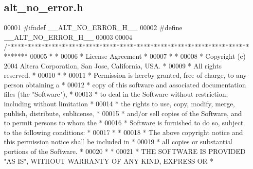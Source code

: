 \subsection{alt\+\_\+no\+\_\+error.\+h}
\label{alt__no__error_8h_source}

\begin{DoxyCode}
00001 \textcolor{preprocessor}{#ifndef \_\_ALT\_NO\_ERROR\_H\_\_}
00002 \textcolor{preprocessor}{#define \_\_ALT\_NO\_ERROR\_H\_\_}
00003 
00004 \textcolor{comment}{/******************************************************************************}
00005 \textcolor{comment}{*                                                                             *}
00006 \textcolor{comment}{* License Agreement                                                           *}
00007 \textcolor{comment}{*                                                                             *}
00008 \textcolor{comment}{* Copyright (c) 2004 Altera Corporation, San Jose, California, USA.           *}
00009 \textcolor{comment}{* All rights reserved.                                                        *}
00010 \textcolor{comment}{*                                                                             *}
00011 \textcolor{comment}{* Permission is hereby granted, free of charge, to any person obtaining a     *}
00012 \textcolor{comment}{* copy of this software and associated documentation files (the "Software"),  *}
00013 \textcolor{comment}{* to deal in the Software without restriction, including without limitation   *}
00014 \textcolor{comment}{* the rights to use, copy, modify, merge, publish, distribute, sublicense,    *}
00015 \textcolor{comment}{* and/or sell copies of the Software, and to permit persons to whom the       *}
00016 \textcolor{comment}{* Software is furnished to do so, subject to the following conditions:        *}
00017 \textcolor{comment}{*                                                                             *}
00018 \textcolor{comment}{* The above copyright notice and this permission notice shall be included in  *}
00019 \textcolor{comment}{* all copies or substantial portions of the Software.                         *}
00020 \textcolor{comment}{*                                                                             *}
00021 \textcolor{comment}{* THE SOFTWARE IS PROVIDED "AS IS", WITHOUT WARRANTY OF ANY KIND, EXPRESS OR  *}

\end{DoxyCode}
